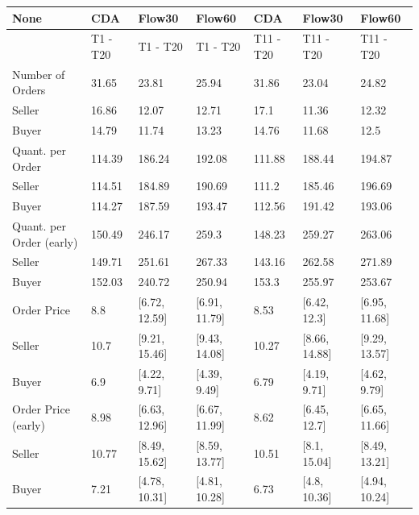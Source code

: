 \begin{tabular}{lllllll}
\hline
 None                     & CDA      & Flow30        & Flow60        & CDA       & Flow30        & Flow60        \\
\hline
                          & T1 - T20 & T1 - T20      & T1 - T20      & T11 - T20 & T11 - T20     & T11 - T20     \\
 Number of Orders         & 31.65    & 23.81         & 25.94         & 31.86     & 23.04         & 24.82         \\
 Seller                   & 16.86    & 12.07         & 12.71         & 17.1      & 11.36         & 12.32         \\
 Buyer                    & 14.79    & 11.74         & 13.23         & 14.76     & 11.68         & 12.5          \\
 Quant. per Order         & 114.39   & 186.24        & 192.08        & 111.88    & 188.44        & 194.87        \\
 Seller                   & 114.51   & 184.89        & 190.69        & 111.2     & 185.46        & 196.69        \\
 Buyer                    & 114.27   & 187.59        & 193.47        & 112.56    & 191.42        & 193.06        \\
 Quant. per Order (early) & 150.49   & 246.17        & 259.3         & 148.23    & 259.27        & 263.06        \\
 Seller                   & 149.71   & 251.61        & 267.33        & 143.16    & 262.58        & 271.89        \\
 Buyer                    & 152.03   & 240.72        & 250.94        & 153.3     & 255.97        & 253.67        \\
 Order Price              & 8.8      & [6.72, 12.59] & [6.91, 11.79] & 8.53      & [6.42, 12.3]  & [6.95, 11.68] \\
 Seller                   & 10.7     & [9.21, 15.46] & [9.43, 14.08] & 10.27     & [8.66, 14.88] & [9.29, 13.57] \\
 Buyer                    & 6.9      & [4.22, 9.71]  & [4.39, 9.49]  & 6.79      & [4.19, 9.71]  & [4.62, 9.79]  \\
 Order Price (early)      & 8.98     & [6.63, 12.96] & [6.67, 11.99] & 8.62      & [6.45, 12.7]  & [6.65, 11.66] \\
 Seller                   & 10.77    & [8.49, 15.62] & [8.59, 13.77] & 10.51     & [8.1, 15.04]  & [8.49, 13.21] \\
 Buyer                    & 7.21     & [4.78, 10.31] & [4.81, 10.28] & 6.73      & [4.8, 10.36]  & [4.94, 10.24] \\

\end{tabular}
